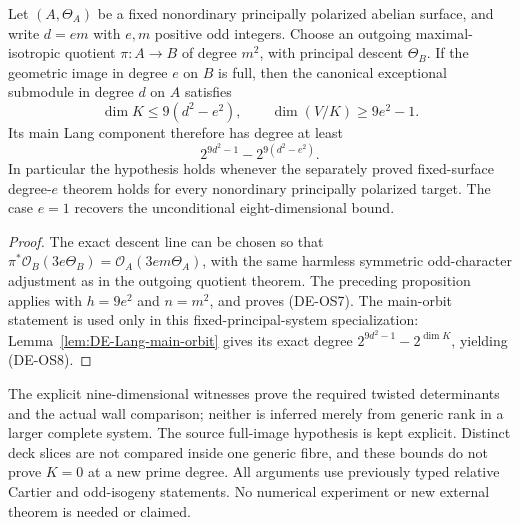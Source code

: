\begin{corollary}
\label{cor:DE-known-odd-divisor-quotient-bound}
Let \((A,\Theta_A)\) be a fixed nonordinary principally polarized
abelian surface, and write \(d=em\) with \(e,m\) positive odd integers. Choose an
outgoing maximal-isotropic quotient \(\pi:A\to B\) of degree
\(m^2\), with principal descent \(\Theta_B\).
If the geometric image in degree \(e\) on \(B\) is full, then the
canonical exceptional submodule in degree \(d\) on \(A\) satisfies
\[
 \dim K\leq 9(d^2-e^2),\qquad
 \dim(V/K)\geq9e^2-1.
 \tag{DE-OS7}
\]
Its main Lang component therefore has degree at least
\[
                   2^{9d^2-1}-2^{9(d^2-e^2)}.
 \tag{DE-OS8}
\]
In particular the hypothesis holds whenever the separately proved
fixed-surface degree-\(e\) theorem holds for every nonordinary
principally polarized target. The case \(e=1\) recovers the
unconditional eight-dimensional bound.
\end{corollary}
\begin{proof}
The exact descent line can be chosen so that
\(\pi^*\mathcal O_B(3e\Theta_B)
  =\mathcal O_A(3em\Theta_A)\), with the same harmless symmetric
odd-character adjustment as in the outgoing quotient theorem.
The preceding proposition applies with \(h=9e^2\) and \(n=m^2\),
and proves (DE-OS7). The main-orbit statement is used only in this
fixed-principal-system specialization: Lemma~\ref{lem:DE-Lang-main-orbit}
gives its exact degree \(2^{9d^2-1}-2^{\dim K}\), yielding (DE-OS8).
\end{proof}

\begin{remark}
\label{rem:DE-odd-source-restriction-scope}
The explicit nine-dimensional witnesses prove the required twisted
determinants and the actual wall comparison; neither is inferred
merely from generic rank in a larger complete system. The source
full-image hypothesis is kept explicit. Distinct deck slices are not
compared inside one generic fibre, and these bounds do not prove
\(K=0\) at a new prime degree. All arguments use previously typed
relative Cartier and odd-isogeny statements. No numerical experiment
or new external theorem is needed or claimed.
\end{remark}
